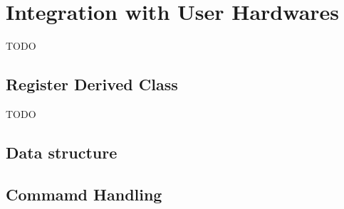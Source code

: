 \section{Integration with User Hardwares}\label{sec:Integration}
TODO


\subsection{Register Derived Class}
TODO


\subsection{Data structure}


\subsection{Commamd Handling}
